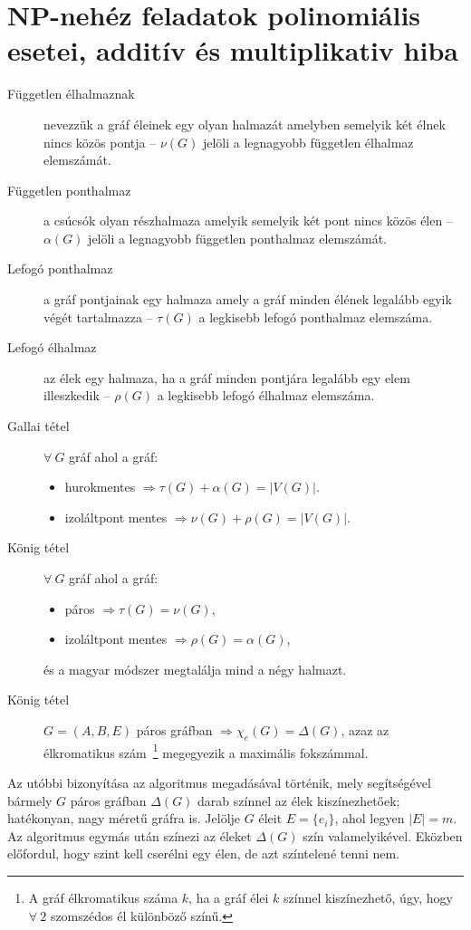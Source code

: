 \section{NP-nehéz feladatok polinomiális esetei, additív és multiplikativ hiba}

\begin{description}
  \item[Független élhalmaznak] nevezzük a gráf éleinek egy olyan halmazát
  amelyben semelyik két élnek nincs közös pontja -- $\nu(G)$ jelöli a legnagyobb
  független élhalmaz elemszámát.
  \item[Független ponthalmaz]  a csúcsók olyan részhalmaza amelyik semelyik két
  pont nincs közös élen -- $\alpha(G)$ jelöli a legnagyobb független ponthalmaz
  elemszámát.
  \item[Lefogó ponthalmaz] a gráf pontjainak egy halmaza amely a gráf minden
  élének legalább egyik végét tartalmazza -- $\tau(G)$ a legkisebb lefogó
  ponthalmaz elemszáma.
  \item[Lefogó élhalmaz] az élek egy halmaza, ha a gráf minden pontjára legalább
  egy elem illeszkedik -- $\rho(G)$ a legkisebb lefogó élhalmaz elemszáma.
  \item[Gallai tétel] $\forall~G$ gráf ahol a gráf: \begin{itemize}
  		\item hurokmentes $\Rightarrow \tau(G)+\alpha(G) = |V(G)|$. 
  		\item izoláltpont mentes $\Rightarrow \nu(G) +\rho(G) = |V(G)|$.
   \end{itemize} 
   \item[König tétel] $\forall~G$ gráf ahol a gráf: \begin{itemize}
     \item páros $\Rightarrow \tau(G)=\nu(G)$,
     \item izoláltpont mentes $\Rightarrow \rho(G) = \alpha(G)$,
   \end{itemize}
   és a magyar módszer megtalálja mind a négy halmazt.
   \item[König tétel] $G=(A,B,E)$ páros gráfban $\Rightarrow \chi_e(G) =
   \Delta(G)$, azaz az élkromatikus szám~\footnote{A gráf élkromatikus száma
   $k$, ha a gráf élei $k$  színnel kiszínezhető, úgy, hogy $\forall~2$
   szomszédos él különböző színű. } megegyezik a maximális fokszámmal.
\end{description}

Az utóbbi bizonyítása az algoritmus megadásával történik, mely segítségével
bármely $G$ páros gráfban $\Delta(G)$ darab színnel az élek kiszínezhetőek;
hatékonyan, nagy méretű gráfra is. Jelölje $G$ éleit $E=\{ e_i \}$, ahol legyen
$|E|=m$. Az algoritmus egymás után színezi az éleket $\Delta(G)$ szín valamelyikével.
Eközben előfordul, hogy szint kell cserélni egy élen, de azt színtelené tenni nem.

